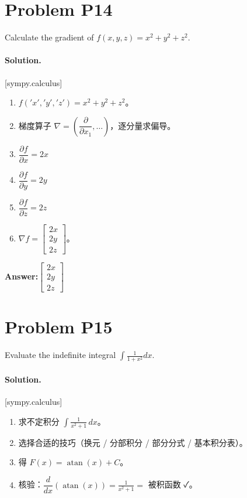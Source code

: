 \documentclass[11pt,a4paper]{ctexart}
\newcommand{\solvertag}[1]{{\footnotesize\color{gray}\textsf{[#1]}}}
\begin{document}
\section*{Problem P14}
Calculate the gradient of $f(x,y,z) = x^{2} + y^{2} + z^{2}$.

\paragraph{Solution.} \solvertag{sympy.calculus} 

\begin{enumerate}[leftmargin=*]
  \item $f('x', 'y', 'z') = x^{2} + y^{2} + z^{2}$。
  \item 梯度算子 $\nabla = \left(\dfrac{\partial}{\partial x_1},\dots\right)$，逐分量求偏导。
  \item $\dfrac{\partial f}{\partial x} = 2 x$
  \item $\dfrac{\partial f}{\partial y} = 2 y$
  \item $\dfrac{\partial f}{\partial z} = 2 z$
  \item $\nabla f = \left[\begin{matrix}2 x\\2 y\\2 z\end{matrix}\right]$。
\end{enumerate}

\noindent\textbf{Answer:}\quad $\left[\begin{matrix}2 x\\2 y\\2 z\end{matrix}\right]$

\medskip

\section*{Problem P15}
Evaluate the indefinite integral $\int \frac{1}{1+x^{2}} dx$.

\paragraph{Solution.} \solvertag{sympy.calculus} 

\begin{enumerate}[leftmargin=*]
  \item 求不定积分 $\displaystyle\int \frac{1}{x^{2} + 1}\, dx$。
  \item 选择合适的技巧（换元 / 分部积分 / 部分分式 / 基本积分表）。
  \item 得 $F(x) = \operatorname{atan}{\left(x \right)} + C$。
  \item 核验：$\dfrac{d}{dx}\left(\operatorname{atan}{\left(x \right)}\right) = \frac{1}{x^{2} + 1} = $ 被积函数 ✓。
\end{enumerate}
\end{document}
